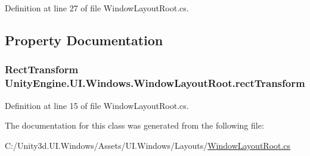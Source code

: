 Definition at line 27 of file Window\+Layout\+Root.\+cs.



\subsection{Property Documentation}
\hypertarget{class_unity_engine_1_1_u_i_1_1_windows_1_1_window_layout_root_a0d5afb0e19f4235b324ae02f4a66976a}{}
\subsubsection[{rect\+Transform}]{\setlength{\rightskip}{0pt plus 5cm}Rect\+Transform Unity\+Engine.\+U\+I.\+Windows.\+Window\+Layout\+Root.\+rect\+Transform\hspace{0.3cm}{\ttfamily [get]}}\label{class_unity_engine_1_1_u_i_1_1_windows_1_1_window_layout_root_a0d5afb0e19f4235b324ae02f4a66976a}


Definition at line 15 of file Window\+Layout\+Root.\+cs.



The documentation for this class was generated from the following file\+:\begin{DoxyCompactItemize}
\item 
C\+:/\+Unity3d.\+U\+I.\+Windows/\+Assets/\+U\+I.\+Windows/\+Layouts/\hyperlink{_window_layout_root_8cs}{Window\+Layout\+Root.\+cs}\end{DoxyCompactItemize}
